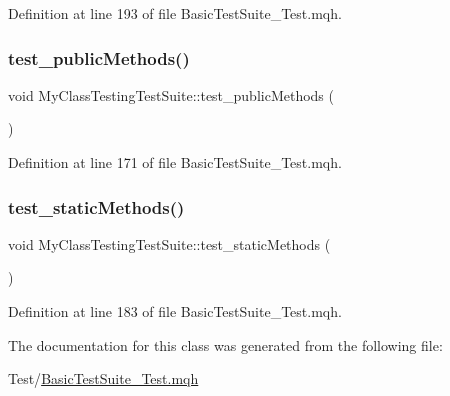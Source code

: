Definition at line 193 of file Basic\+Test\+Suite\+\_\+\+Test.\+mqh.

\mbox{\label{class_my_class_testing_test_suite_a2f8139a2e71068665e18f99781358111}} 
\subsubsection{\texorpdfstring{test\+\_\+public\+Methods()}{test\_publicMethods()}}
{\footnotesize\ttfamily void My\+Class\+Testing\+Test\+Suite\+::test\+\_\+public\+Methods (\begin{DoxyParamCaption}{ }\end{DoxyParamCaption})\hspace{0.3cm}{\ttfamily [inline]}}



Definition at line 171 of file Basic\+Test\+Suite\+\_\+\+Test.\+mqh.

\mbox{\label{class_my_class_testing_test_suite_aadb56765b805c6dadcb2fb6d3c607e27}} 
\subsubsection{\texorpdfstring{test\+\_\+static\+Methods()}{test\_staticMethods()}}
{\footnotesize\ttfamily void My\+Class\+Testing\+Test\+Suite\+::test\+\_\+static\+Methods (\begin{DoxyParamCaption}{ }\end{DoxyParamCaption})\hspace{0.3cm}{\ttfamily [inline]}}



Definition at line 183 of file Basic\+Test\+Suite\+\_\+\+Test.\+mqh.



The documentation for this class was generated from the following file\+:\begin{DoxyCompactItemize}
\item 
Test/\mbox{\hyperlink{_basic_test_suite___test_8mqh}{Basic\+Test\+Suite\+\_\+\+Test.\+mqh}}\end{DoxyCompactItemize}
